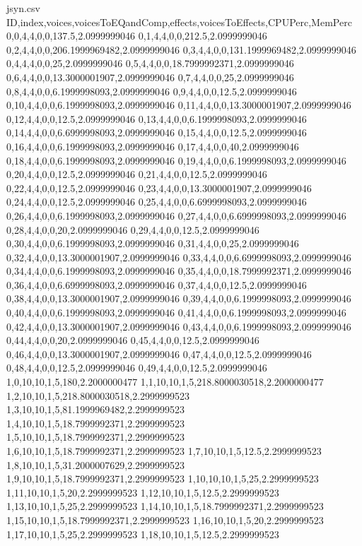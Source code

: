\begin{filecontents*}{jsyn.csv}
ID,index,voices,voicesToEQandComp,effects,voicesToEffects,CPUPerc,MemPerc
0,0,4,4,0,0,137.5,2.0999999046
0,1,4,4,0,0,212.5,2.0999999046
0,2,4,4,0,0,206.1999969482,2.0999999046
0,3,4,4,0,0,131.1999969482,2.0999999046
0,4,4,4,0,0,25,2.0999999046
0,5,4,4,0,0,18.7999992371,2.0999999046
0,6,4,4,0,0,13.3000001907,2.0999999046
0,7,4,4,0,0,25,2.0999999046
0,8,4,4,0,0,6.1999998093,2.0999999046
0,9,4,4,0,0,12.5,2.0999999046
0,10,4,4,0,0,6.1999998093,2.0999999046
0,11,4,4,0,0,13.3000001907,2.0999999046
0,12,4,4,0,0,12.5,2.0999999046
0,13,4,4,0,0,6.1999998093,2.0999999046
0,14,4,4,0,0,6.6999998093,2.0999999046
0,15,4,4,0,0,12.5,2.0999999046
0,16,4,4,0,0,6.1999998093,2.0999999046
0,17,4,4,0,0,40,2.0999999046
0,18,4,4,0,0,6.1999998093,2.0999999046
0,19,4,4,0,0,6.1999998093,2.0999999046
0,20,4,4,0,0,12.5,2.0999999046
0,21,4,4,0,0,12.5,2.0999999046
0,22,4,4,0,0,12.5,2.0999999046
0,23,4,4,0,0,13.3000001907,2.0999999046
0,24,4,4,0,0,12.5,2.0999999046
0,25,4,4,0,0,6.6999998093,2.0999999046
0,26,4,4,0,0,6.1999998093,2.0999999046
0,27,4,4,0,0,6.6999998093,2.0999999046
0,28,4,4,0,0,20,2.0999999046
0,29,4,4,0,0,12.5,2.0999999046
0,30,4,4,0,0,6.1999998093,2.0999999046
0,31,4,4,0,0,25,2.0999999046
0,32,4,4,0,0,13.3000001907,2.0999999046
0,33,4,4,0,0,6.6999998093,2.0999999046
0,34,4,4,0,0,6.1999998093,2.0999999046
0,35,4,4,0,0,18.7999992371,2.0999999046
0,36,4,4,0,0,6.6999998093,2.0999999046
0,37,4,4,0,0,12.5,2.0999999046
0,38,4,4,0,0,13.3000001907,2.0999999046
0,39,4,4,0,0,6.1999998093,2.0999999046
0,40,4,4,0,0,6.1999998093,2.0999999046
0,41,4,4,0,0,6.1999998093,2.0999999046
0,42,4,4,0,0,13.3000001907,2.0999999046
0,43,4,4,0,0,6.1999998093,2.0999999046
0,44,4,4,0,0,20,2.0999999046
0,45,4,4,0,0,12.5,2.0999999046
0,46,4,4,0,0,13.3000001907,2.0999999046
0,47,4,4,0,0,12.5,2.0999999046
0,48,4,4,0,0,12.5,2.0999999046
0,49,4,4,0,0,12.5,2.0999999046
1,0,10,10,1,5,180,2.2000000477
1,1,10,10,1,5,218.8000030518,2.2000000477
1,2,10,10,1,5,218.8000030518,2.2999999523
1,3,10,10,1,5,81.1999969482,2.2999999523
1,4,10,10,1,5,18.7999992371,2.2999999523
1,5,10,10,1,5,18.7999992371,2.2999999523
1,6,10,10,1,5,18.7999992371,2.2999999523
1,7,10,10,1,5,12.5,2.2999999523
1,8,10,10,1,5,31.2000007629,2.2999999523
1,9,10,10,1,5,18.7999992371,2.2999999523
1,10,10,10,1,5,25,2.2999999523
1,11,10,10,1,5,20,2.2999999523
1,12,10,10,1,5,12.5,2.2999999523
1,13,10,10,1,5,25,2.2999999523
1,14,10,10,1,5,18.7999992371,2.2999999523
1,15,10,10,1,5,18.7999992371,2.2999999523
1,16,10,10,1,5,20,2.2999999523
1,17,10,10,1,5,25,2.2999999523
1,18,10,10,1,5,12.5,2.2999999523

\end{filecontents*}
